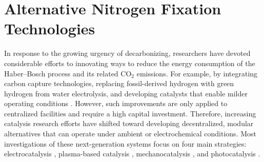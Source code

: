 \section{Alternative Nitrogen Fixation Technologies}
In response to the growing urgency of decarbonizing, researchers have devoted considerable efforts to innovating ways to reduce the energy consumption of the Haber–Bosch process and its related CO$_2$ emissions. For example, by integrating carbon capture technologies, replacing fossil-derived hydrogen with green hydrogen from water electrolysis, and developing catalysts that enable milder operating conditions \cite{2023GreenSynthesis, Torrente-Murciano2023ProcessProduction, Ye2023ProspectsSynthesis, Gabrielli2023Net-zeroResources, Rosa2023EnergyEmissions, Gabrielli2020TheIndustry, Aika1972ActivationMetal, Sato2017ASynthesis, Kitano2018Self-organizedSynthesis}. However, such improvements are only applied to centralized facilities and require a high capital investment. Therefore, increasing catalysis research efforts have shifted toward developing decentralized, modular alternatives that can operate under ambient or electrochemical conditions. Most investigations of these next-generation systems focus on four main strategies: electrocatalysis \cite{Foster2018CatalystsAmmonia, Wang2018AmbientOverpotential, Westhead2021IsElectroreduction, Bagger2021RoleElectrodes}, plasma-based catalysis \cite{Gorbanev2024PlasmaIt, Hong2017PlasmaProgress, Rouwenhorst2021Plasma-catalyticPlasma, Sun2021AProduction}, mechanocatalysis \cite{Reichle2024MechanocatalyticPathway, DeWitt2023StructuralSynthesis, Tricker2020MechanocatalyticMicroenvironments}, and photocatalysis \cite{comer2018role, Huang2023FormationIllumination, Tian2023ScreeningAir, Zhang2019PhotocatalyticFuture}.

